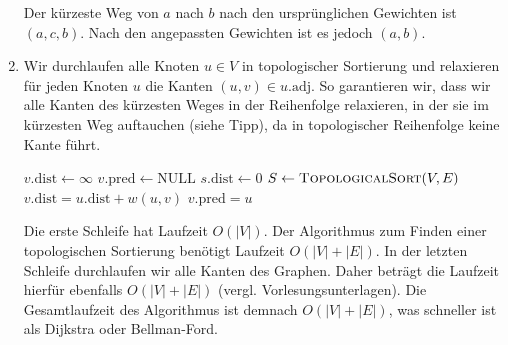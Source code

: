 \documentclass[11pt,a4paper]{article}
\begin{document}
\begin{loesung}
\begin{enumerate}
\begin{figure}[h!]
\begin{subfigure}{0.2\textwidth}
            \end{subfigure}
        \end{figure}
        \FloatBarrier
        Der kürzeste Weg von $a$ nach $b$ nach den ursprünglichen Gewichten ist $(a, c, b)$.
        Nach den angepassten Gewichten ist es jedoch $(a, b)$.

        \item
        Wir durchlaufen alle Knoten $u \in V$ in topologischer Sortierung und relaxieren für jeden Knoten $u$ die Kanten $(u, v) \in u.\mathrm{adj}$.
        So garantieren wir, dass wir alle Kanten des kürzesten Weges in der Reihenfolge relaxieren, in der sie im kürzesten Weg auftauchen (siehe Tipp), da in topologischer Reihenfolge keine Kante  führt.
        \begin{algorithmic}[1]
                    \State $v.\mathrm{dist} \gets \infty$
                    \State $v.\mathrm{pred} \gets \mathrm{NULL}$
                \EndFor
                \State $s.\mathrm{dist} \gets 0$
                \State $S \gets \text{\textsc{TopologicalSort}}(V, E)$
                            \State $v.\mathrm{dist} = u.\mathrm{dist} + w(u, v)$
                            \State $v.\mathrm{pred} = u$
                        \EndIf
                    \EndFor
                \EndFor
            \EndProcedure
        \end{algorithmic}
        Die erste Schleife hat Laufzeit $O(|V|)$.
        Der Algorithmus zum Finden einer topologischen Sortierung benötigt Laufzeit $O(|V| + |E|)$.
        In der letzten Schleife durchlaufen wir alle Kanten des Graphen.
        Daher beträgt die Laufzeit hierfür ebenfalls $O(|V| + |E|)$ (vergl. Vorlesungsunterlagen).
        Die Gesamtlaufzeit des Algorithmus ist demnach $O(|V| + |E|)$, was schneller ist als Dijkstra oder Bellman-Ford.


\end{enumerate}
\end{loesung}
\end{document}
